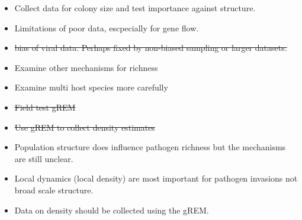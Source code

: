 
\begin{itemize}
\item Collect data for colony size and test importance against structure.
\item Limitations of poor data, escpecially for gene flow.
\item \sout{bias of viral data. Perhaps fixed by non-biased sampling or larger datasets.}
\item Examine other mechanisms for richness
\item Examine multi host species more carefully
\item \sout{Field test gREM}
\item \sout{Use gREM to collect density estimates }
\end{itemize}



\begin{itemize}
\item Population structure does influence pathogen richness but the mechanisms are still unclear.
\item Local dynamics (local density) are most important for pathogen invasions not broad scale structure.
\item Data on density should be collected using the gREM.
\end{itemize}





